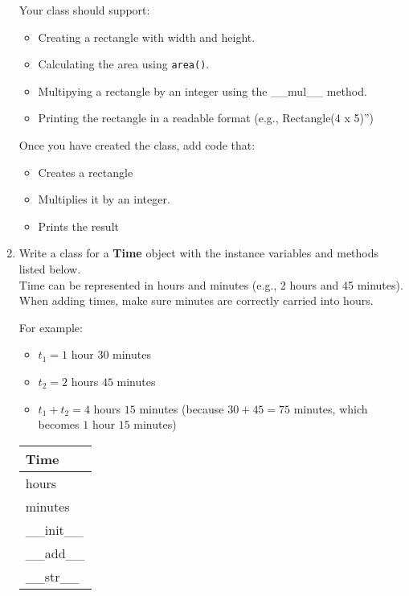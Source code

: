 \documentclass{article}
\newcommand{\csq}[1]{\reflectbox{''}#1''}  %
\begin{document}
\begin{enumerate}
		Your class should support:
		\begin{itemize}
			\item Creating a rectangle with width and height.
			\item Calculating the area using \texttt{area()}.
			\item Multipying a rectangle by an integer using the  \_\_mul\_\_ method.
			\item Printing the rectangle in a readable format (e.g., \csq{Rectangle(4 x 5)})
		\end{itemize}
		
		Once you have created the class, add code that:
		\begin{itemize}
			\item Creates a rectangle
			\item Multiplies it by an integer.
			\item Prints the result
		\end{itemize}




	\item
		Write a class for a \textbf{Time} object with the instance variables and methods listed 
		below.\\
		Time can be represented in hours and minutes (e.g., 2 hours and 45 minutes). \\
		When adding times, make sure minutes are correctly carried into hours.

		\begin{minipage}[t]{0.65\textwidth}
			For example:
			\begin{itemize}
				\item $t_1 = 1$ hour $30$ minutes
				\item $t_2 = 2$ hours $45$ minutes
				\item $t_1 + t_2 = 4$ hours $15$ minutes 
					(because $30 + 45 = 75$ minutes, which becomes $1$ hour $15$ minutes)
			\end{itemize}

		\end{minipage}
		\hfill
		\begin{minipage}[t]{0.32\textwidth}
			\vspace{.2em}
			\begin{flushright}
				\begin{tabular}{|l|}
					\hline
					Time \\ \hline
					hours \\
					minutes \\ \hline
					\_\_init\_\_ \\
					\_\_add\_\_ \\
					\_\_str\_\_ \\ \hline
				\end{tabular}
			\end{flushright}
		\end{minipage}
		

\end{enumerate}
\end{document}
